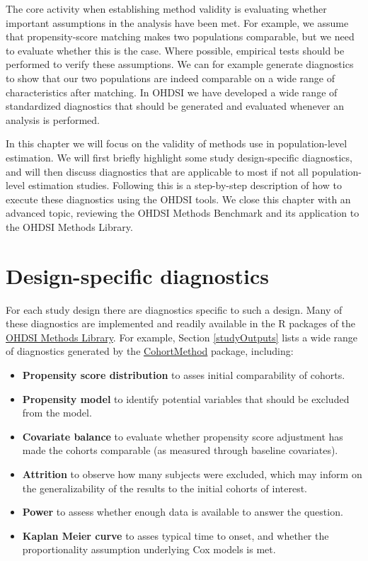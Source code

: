\documentclass[11pt]{book}
\providecommand{\tightlist}{%
  \setlength{\itemsep}{0pt}\setlength{\parskip}{0pt}}
\begin{document}
The core activity when establishing method validity is evaluating
whether important assumptions in the analysis have been met. For
example, we assume that propensity-score matching makes two populations
comparable, but we need to evaluate whether this is the case. Where
possible, empirical tests should be performed to verify these
assumptions. We can for example generate diagnostics to show that our
two populations are indeed comparable on a wide range of characteristics
after matching. In OHDSI we have developed a wide range of standardized
diagnostics that should be generated and evaluated whenever an analysis
is performed.

In this chapter we will focus on the validity of methods use in
population-level estimation. We will first briefly highlight some study
design-specific diagnostics, and will then discuss diagnostics that are
applicable to most if not all population-level estimation studies.
Following this is a step-by-step description of how to execute these
diagnostics using the OHDSI tools. We close this chapter with an
advanced topic, reviewing the OHDSI Methods Benchmark and its
application to the OHDSI Methods Library.

\section{Design-specific diagnostics}\label{design-specific-diagnostics}

For each study design there are diagnostics specific to such a design.
Many of these diagnostics are implemented and readily available in the R
packages of the \href{https://ohdsi.github.io/MethodsLibrary/}{OHDSI
Methods Library}. For example, Section \ref{studyOutputs} lists a wide
range of diagnostics generated by the
\href{https://ohdsi.github.io/CohortMethod/}{CohortMethod} package,
including:

\begin{itemize}
\tightlist
\item
  \textbf{Propensity score distribution} to asses initial comparability
  of cohorts.
\item
  \textbf{Propensity model} to identify potential variables that should
  be excluded from the model.
\item
  \textbf{Covariate balance} to evaluate whether propensity score
  adjustment has made the cohorts comparable (as measured through
  baseline covariates).
\item
  \textbf{Attrition} to observe how many subjects were excluded, which
  may inform on the generalizability of the results to the initial
  cohorts of interest.
\item
  \textbf{Power} to assess whether enough data is available to answer
  the question.
\item
  \textbf{Kaplan Meier curve} to asses typical time to onset, and
  whether the proportionality assumption underlying Cox models is met.
\end{itemize}
\end{document}
